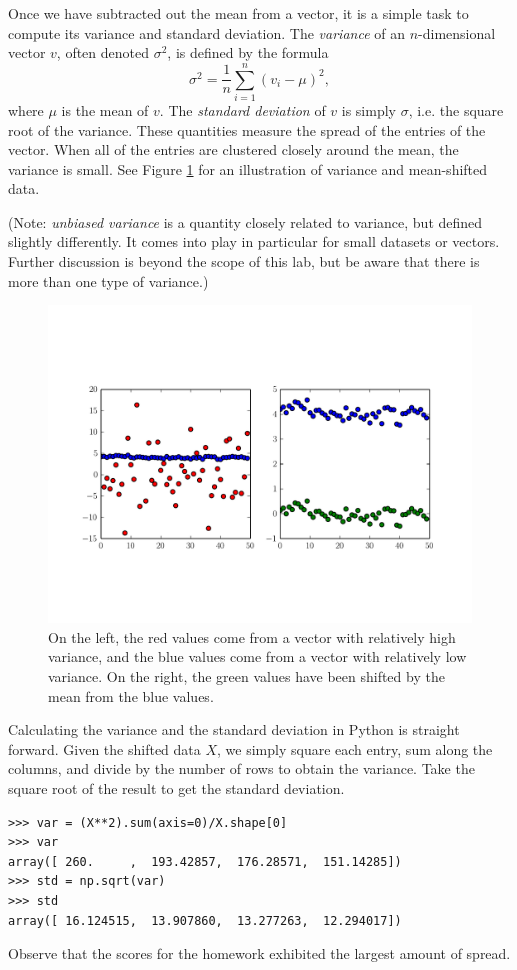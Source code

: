 Once we have subtracted out the mean from a vector, it is a simple task to compute its variance and standard deviation.
The \emph{variance} of an $n$-dimensional vector $v$, often denoted $\sigma^2$, is defined by the formula
\[
\sigma^2 = \frac{1}{n}\displaystyle\sum_{i=1}^n (v_i - \mu)^2,
\]
where $\mu$ is the mean of $v$. The \emph{standard deviation} of $v$ is simply $\sigma$, i.e. the square
root of the variance. These quantities measure the spread of the entries of the vector. When all of the entries are clustered
closely around the mean, the variance is small. See Figure \ref{fig:variance} for an illustration of variance and mean-shifted data.

(Note: \emph{unbiased variance} is a quantity closely related to variance, but defined slightly differently. It comes into play
in particular for small datasets or vectors. Further discussion is beyond the scope of this lab, but be aware that there is
more than one type of variance.)

\begin{figure}
\includegraphics[width=\textwidth]{variance}
\caption{On the left, the red values come from a vector with relatively high variance,
         and the blue values come from a vector with relatively low variance.
         On the right, the green values have been shifted by the mean from the blue values.}
\label{fig:variance}
\end{figure}

Calculating the variance and the standard deviation in Python is straight forward.
Given the shifted data $X$, we simply square each entry, sum along the columns, and divide by the number of rows
to obtain the variance. Take the square root of the result to get the standard deviation.
\begin{lstlisting}
>>> var = (X**2).sum(axis=0)/X.shape[0]
>>> var
array([ 260.     ,  193.42857,  176.28571,  151.14285])
>>> std = np.sqrt(var)
>>> std
array([ 16.124515,  13.907860,  13.277263,  12.294017])
\end{lstlisting}
Observe that the scores for the homework exhibited the largest amount of spread.

